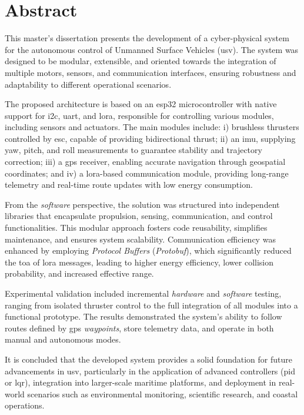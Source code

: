 \chapter*{Abstract}

This master's dissertation presents the development of a cyber-physical system for the autonomous control of Unmanned Surface Vehicles (\acrfull{usv}). The system was designed to be modular, extensible, and oriented towards the integration of multiple motors, sensors, and communication interfaces, ensuring robustness and adaptability to different operational scenarios.  

The proposed architecture is based on an \gls{esp32} microcontroller with native support for \gls{i2c}, \gls{uart}, and \gls{lora}, responsible for controlling various modules, including sensors and actuators. The main modules include: i) brushless thrusters controlled by \acrfull{esc}, capable of providing bidirectional thrust; ii) an \acrfull{imu}, supplying yaw, pitch, and roll measurements to guarantee stability and trajectory correction; iii) a \acrfull{gps} receiver, enabling accurate navigation through geospatial coordinates; and iv) a \gls{lora}-based communication module, providing long-range telemetry and real-time route updates with low energy consumption.  

From the \emph{software} perspective, the solution was structured into independent libraries that encapsulate propulsion, sensing, communication, and control functionalities. This modular approach fosters code reusability, simplifies maintenance, and ensures system scalability. Communication efficiency was enhanced by employing \emph{Protocol Buffers} (\emph{Protobuf}), which significantly reduced the \gls{toa} of \gls{lora} messages, leading to higher energy efficiency, lower collision probability, and increased effective range.  

Experimental validation included incremental \emph{hardware} and \emph{software} testing, ranging from isolated thruster control to the full integration of all modules into a functional prototype. The results demonstrated the system's ability to follow routes defined by \acrfull{gps} \emph{waypoints}, store telemetry data, and operate in both manual and autonomous modes.  

It is concluded that the developed system provides a solid foundation for future advancements in \gls{usv}, particularly in the application of advanced controllers (\acrfull{pid} or \acrfull{lqr}), integration into larger-scale maritime platforms, and deployment in real-world scenarios such as environmental monitoring, scientific research, and coastal operations.

